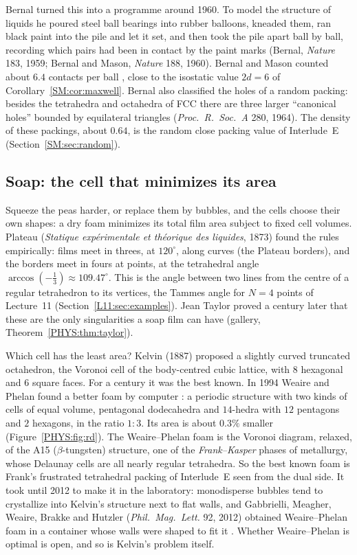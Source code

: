 \documentclass[11pt,openany]{book}
\theoremstyle{plain}
\theoremstyle{definition}
\theoremstyle{remark}
\begin{document}
Bernal turned this into a programme around 1960. To model the structure of liquids he poured steel
ball bearings into rubber balloons, kneaded them, ran black paint into the pile and let it set, and
then took the pile apart ball by ball, recording which pairs had been in contact by the paint marks
(Bernal, \emph{Nature} 183, 1959; Bernal and Mason, \emph{Nature} 188, 1960). Bernal and Mason counted
about $6.4$ contacts per ball , close to the isostatic value $2d=6$ of
Corollary~\ref{SM:cor:maxwell}. Bernal also classified the holes of a random packing: besides the tetrahedra and octahedra of FCC there
are three larger ``canonical holes'' bounded by equilateral triangles (\emph{Proc.\ R.\ Soc.\ A} 280, 1964). The density of these packings, about $0.64$, is the
random close packing value of Interlude~E (Section~\ref{SM:sec:random}).

\subsection*{Soap: the cell that minimizes its area}
Squeeze the peas harder, or replace them by bubbles, and the cells choose their own shapes: a dry
foam minimizes its total film area subject to fixed cell volumes. Plateau (\emph{Statique
exp\'erimentale et th\'eorique des liquides}, 1873) found the rules empirically: films meet in threes, at
$120^\circ$, along curves (the Plateau borders), and the borders meet in fours at points, at the
tetrahedral angle $\arccos(-\frac13)\approx109.47^\circ$. This is the angle between two lines from the
centre of a regular tetrahedron to its vertices, the Tammes angle for $N=4$ points of
Lecture~11 (Section~\ref{L11:sec:examples}). Jean Taylor proved a century later that these are the only
singularities a soap film can have (gallery, Theorem~\ref{PHYS:thm:taylor}).

Which cell has the least area? Kelvin (1887) proposed a slightly curved truncated octahedron, the
Voronoi cell of the body-centred cubic lattice, with $8$ hexagonal and $6$ square faces. For a century
it was the best known. In 1994 Weaire and Phelan found a better foam by computer :
a periodic structure with two kinds of cells of equal volume, pentagonal dodecahedra and $14$-hedra
with $12$ pentagons and $2$ hexagons, in the ratio $1:3$. Its area is about $0.3\%$ smaller
(Figure~\ref{PHYS:fig:rd}). The Weaire--Phelan foam is the Voronoi diagram, relaxed, of the A15
($\beta$-tungsten) structure, one of the \emph{Frank--Kasper} phases of metallurgy, whose Delaunay cells
are all nearly regular tetrahedra. So the best known foam is Frank's frustrated tetrahedral packing of
Interlude~E seen from the dual side. It took until 2012 to make it in the laboratory: monodisperse
bubbles tend to crystallize into Kelvin's structure next to flat walls, and Gabbrielli, Meagher, Weaire, Brakke
and Hutzler (\emph{Phil.\ Mag.\ Lett.} 92, 2012) obtained Weaire--Phelan foam in a container whose walls
were shaped to fit it . Whether Weaire--Phelan is optimal is open, and so is
Kelvin's problem itself.
\end{document}
